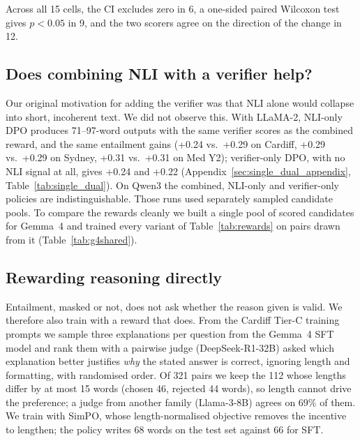 Across all 15 cells, the CI excludes zero in 6, a one-sided paired Wilcoxon test gives $p{<}0.05$ in 9, and the two scorers agree on the direction of the change in 12.

\subsection{Does combining NLI with a verifier help?}
\label{sec:single_dual}
\label{sec:variant_ablation}



Our original motivation for adding the verifier was that NLI alone would collapse into short, incoherent text. We did not observe this. With LLaMA-2, NLI-only DPO produces 71--97-word outputs with the same verifier scores as the combined reward, and the same entailment gains (+0.24 vs.\ +0.29 on Cardiff, +0.29 vs.\ +0.29 on Sydney, +0.31 vs.\ +0.31 on Med Y2); verifier-only DPO, with no NLI signal at all, gives +0.24 and +0.22 (Appendix~\ref{sec:single_dual_appendix}, Table~\ref{tab:single_dual}). On Qwen3 the combined, NLI-only and verifier-only policies are indistinguishable. Those runs used separately sampled candidate pools. To compare the rewards cleanly we built a single pool of scored candidates for Gemma~4 and trained every variant of Table~\ref{tab:rewards} on pairs drawn from it (Table~\ref{tab:g4shared}).

\GSHAREDTEXT

\subsection{Rewarding reasoning directly}
\label{sec:reasoning-reward}

Entailment, masked or not, does not ask whether the reason given is valid. We therefore also train with a reward that does. From the Cardiff Tier-C training prompts we sample three explanations per question from the Gemma~4 SFT model and rank them with a pairwise judge (DeepSeek-R1-32B) asked which explanation better justifies \emph{why} the stated answer is correct, ignoring length and formatting, with randomised order. Of 321 pairs we keep the 112 whose lengths differ by at most 15 words (chosen 46, rejected 44 words), so length cannot drive the preference; a judge from another family (Llama-3-8B) agrees on 69\% of them. We train with SimPO, whose length-normalised objective removes the incentive to lengthen; the policy writes 68 words on the test set against 66 for SFT.

